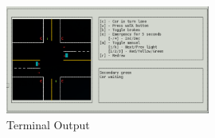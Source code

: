 \documentclass[10pt]{article}
\begin{document}
\begin{figure}[H]
    \centering
    \includegraphics[width=0.6\textwidth]{lights.png}
    \caption{Terminal Output}
\end{figure}

\end{document}

